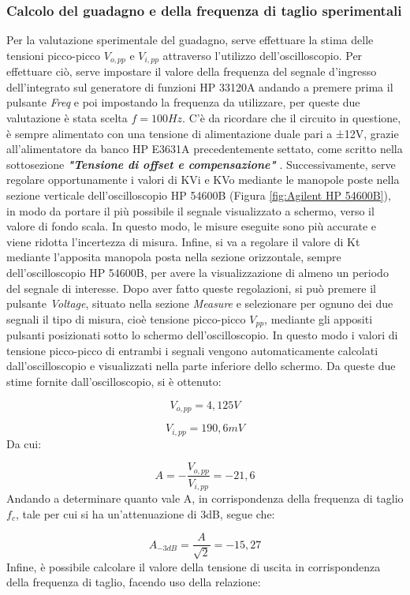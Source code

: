 \subsubsection{Calcolo del guadagno e della frequenza di taglio sperimentali}
Per la valutazione sperimentale del guadagno, serve effettuare la stima delle tensioni picco-picco \(V_{o,pp}\)
e \(V_{i, pp}\) attraverso l'utilizzo dell'oscilloscopio. 
Per effettuare ciò, serve impostare il valore della frequenza del segnale d'ingresso dell'integrato sul
generatore di funzioni HP 33120A andando a premere prima il pulsante \textit{Freq} e poi impostando la frequenza da utilizzare, per queste due valutazione è stata scelta \(f=100Hz\). C'è da ricordare che il circuito in questione, è sempre alimentato con una tensione di alimentazione duale pari a ±12V, grazie all'alimentatore da banco HP E3631A precedentemente settato, come scritto nella sottosezione \textbf{\textit{"Tensione di offset e compensazione"}} .  Successivamente, serve regolare opportunamente i valori di KVi e KVo mediante le manopole poste nella sezione verticale dell'oscilloscopio HP 54600B (Figura \ref{fig:Agilent HP 54600B}), in modo da portare il più possibile il segnale visualizzato a schermo, verso il valore di fondo scala. In questo modo, le misure eseguite sono più accurate e viene ridotta l’incertezza di misura. Infine, si va a regolare il valore di Kt mediante l’apposita manopola posta nella sezione orizzontale, sempre dell'oscilloscopio HP 54600B, per avere la visualizzazione di almeno un periodo del segnale di interesse. 
Dopo aver fatto queste regolazioni, si può premere il pulsante \textit{Voltage}, situato nella sezione \textit{Measure} e selezionare per ognuno dei due segnali il tipo di misura, cioè tensione picco-picco \(V_{pp}\), mediante gli appositi pulsanti posizionati sotto lo schermo dell'oscilloscopio. In questo modo i valori di tensione picco-picco di entrambi i segnali vengono automaticamente calcolati dall’oscilloscopio e visualizzati nella parte inferiore dello schermo.
Da queste due stime fornite dall'oscilloscopio, si è ottenuto:

\[V_{o,pp}=4,125V\]

\[V_{i, pp}=190,6mV\]
Da cui:

\[A=-\frac{V_{o,pp}}{V_{i, pp}}=-21,6\]
Andando a determinare quanto vale A, in corrispondenza della frequenza di taglio \(f_c\), tale per cui si ha un'attenuazione di 3dB, segue che:

\[A_{-3dB}=\frac{A}{\sqrt{2}}=-15,27\]
Infine, è possibile calcolare il valore della tensione di uscita in corrispondenza della frequenza di
taglio, facendo uso della relazione:

